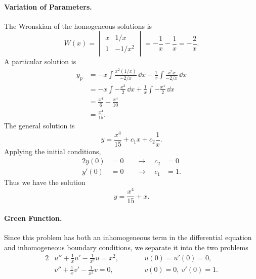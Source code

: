 {\begin{Solution}
  \paragraph{Variation of Parameters.}
  The Wronskian of the homogeneous solutions is
  \[W(x) = 
  \begin{vmatrix}
    x       & 1/x \\
    1       & -1/x^2
  \end{vmatrix}
  = -\frac{1}{x} - \frac{1}{x} = -\frac{2}{x}.
  \]
  A particular solution is
  \begin{align*}
    y_p     &= - x \int \frac{x^2(1/x)}{-2/x}\,\dd x 
    + \frac{1}{x} \int \frac{x^2 x}{-2/x}\,\dd x \\
    &= -x \int -\frac{x^2}{2}\,\dd x 
    + \frac{1}{x} \int -\frac{x^4}{2}\,\dd x \\
    &= \frac{x^4}{6} - \frac{x^4}{10} \\
    &= \frac{x^4}{15}.
  \end{align*}
  The general solution is
  \[y = \frac{x^4}{15} + c_1 x + c_2 \frac{1}{x}.\]
  Applying the initial conditions,
  \begin{alignat*}{2}
    y(0) &= 0 \quad &\to \quad c_2 &= 0 \\
    y'(0) &= 0 \quad &\to \quad c_1 &= 1.
  \end{alignat*}
  Thus we have the solution 
  \[ \boxed{y = \frac{x^4}{15} + x.} \]



  \paragraph{Green Function.}
  Since this problem has both an inhomogeneous term in the differential equation
  and inhomogeneous boundary conditions, we separate it into the two problems
  \begin{alignat*}{2}
    &u'' + \frac{1}{x} u' - \frac{1}{x^2} u = x^2, &\qquad &u(0) = u'(0) = 0, \\
    &v'' + \frac{1}{x} v' - \frac{1}{x^2} v = 0, &\qquad &v(0) = 0,\ v'(0) = 1.
  \end{alignat*}


\end{Solution}}
